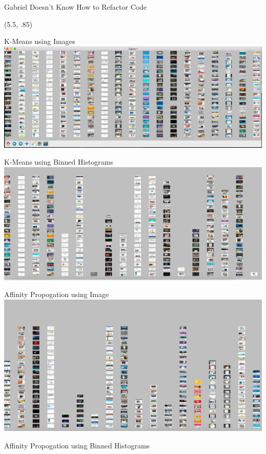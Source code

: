 \documentclass{beamer}
\begin{document}
\begin{frame}{\centerline{\Huge Gabriel Doesn't Know How to Refactor Code}}
\begin{textblock}{5}
\end{textblock}

\begin{textblock}{5}(5.5, .85)

\begin{block}{K-Means using Images}
\includegraphics[scale=.5]{imgkmeans.png}
\end{block}
\begin{block}{ K-Means using Binned Histograms}
\includegraphics[scale=.5]{binKmeans.jpg}
\end{block}
\begin{block}{Affinity Propogation using Image}
\includegraphics[scale=.5]{affPropImg.jpg}
\end{block}
\begin{block}{Affinity Propogation using Binned Histograms}

\end{block}
\end{textblock}
\end{frame}
\end{document}
